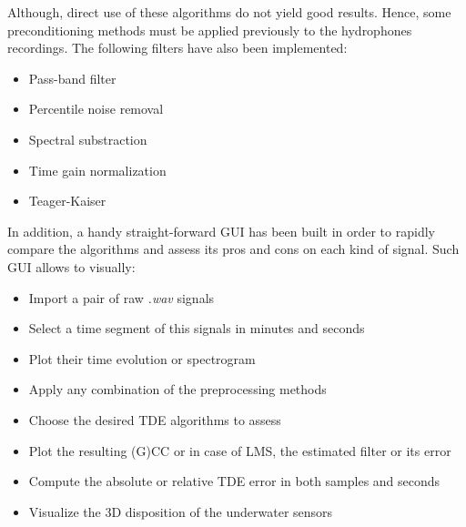  Although, direct use of these algorithms do not yield good results. Hence, some preconditioning methods must be applied previously to the hydrophones recordings. The following filters have also been implemented:
  \begin{itemize}
    \item Pass-band filter
    \item Percentile noise removal
    \item Spectral substraction
    \item Time gain normalization
    \item Teager-Kaiser
  \end{itemize}
  \vspace{5pt}
  
  In addition, a handy straight-forward GUI has been built in order to rapidly compare the algorithms and assess its pros and cons on each kind of signal. Such GUI allows to visually:
  \begin{itemize}
    \item Import a pair of raw \textit{.wav} signals
    \item Select a time segment of this signals in minutes and seconds
    \item Plot their time evolution or spectrogram
    \item Apply any combination of the preprocessing methods
    \item Choose the desired TDE algorithms to assess
    \item Plot the resulting (G)CC or in case of LMS, the estimated filter or its error
    \item Compute the absolute or relative TDE error in both samples and seconds
    \item Visualize the 3D disposition of the underwater sensors
  \end{itemize}
  \vspace{5pt}
